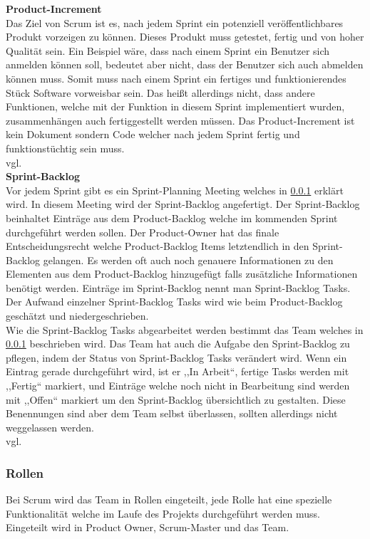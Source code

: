 			\textbf{Product-Increment} \\
			Das Ziel von Scrum ist es, nach jedem Sprint ein potenziell veröffentlichbares Produkt vorzeigen zu können. Dieses Produkt muss getestet, fertig und von hoher Qualität sein. Ein Beispiel wäre, dass nach einem Sprint ein Benutzer sich anmelden können soll, bedeutet aber nicht, dass der Benutzer sich auch abmelden können muss. Somit muss nach einem Sprint ein fertiges und funktionierendes Stück Software vorweisbar sein. Das heißt allerdings nicht, dass andere Funktionen, welche mit der Funktion in diesem Sprint implementiert wurden, zusammenhängen auch fertiggestellt werden müssen. Das Product-Increment ist kein Dokument sondern Code welcher nach jedem Sprint fertig und funktionstüchtig sein muss.\\ vgl. \textcite{ScrumProduct-Increment}\\

			\textbf{Sprint-Backlog} \\ 
			Vor jedem Sprint gibt es ein Sprint-Planning Meeting welches in \ref{sec:Rollen} erklärt wird. In diesem Meeting wird der Sprint-Backlog angefertigt. Der Sprint-Backlog beinhaltet Einträge aus dem Product-Backlog welche im kommenden Sprint durchgeführt werden sollen. Der Product-Owner hat das finale Entscheidungsrecht welche Product-Backlog Items letztendlich in den Sprint-Backlog gelangen. Es werden oft auch noch genauere Informationen zu den Elementen aus dem Product-Backlog hinzugefügt falls zusätzliche Informationen benötigt werden.
			Einträge im Sprint-Backlog nennt man Sprint-Backlog Tasks. Der Aufwand einzelner Sprint-Backlog Tasks wird wie beim Product-Backlog geschätzt und niedergeschrieben.\\
			Wie die Sprint-Backlog Tasks abgearbeitet werden bestimmt das Team welches in \ref{sec:Rollen} beschrieben wird. Das Team hat auch die Aufgabe den Sprint-Backlog zu pflegen, indem der Status von Sprint-Backlog Tasks verändert wird. Wenn ein Eintrag gerade durchgeführt wird, ist er ,,In Arbeit``, fertige Tasks werden mit ,,Fertig`` markiert, und Einträge welche noch nicht in Bearbeitung sind werden mit ,,Offen`` markiert um den Sprint-Backlog übersichtlich zu gestalten. Diese Benennungen sind aber dem Team selbst überlassen, sollten allerdings nicht weggelassen werden.\\ vgl. \textcite{ScrumSprint-Backlog} \\ 
	\subsubsection{Rollen}
	\label{sec:Rollen}
		Bei Scrum wird das Team in Rollen eingeteilt, jede Rolle hat eine spezielle Funktionalität welche im Laufe des Projekts durchgeführt werden muss. Eingeteilt wird in Product Owner, Scrum-Master und das Team. \\


